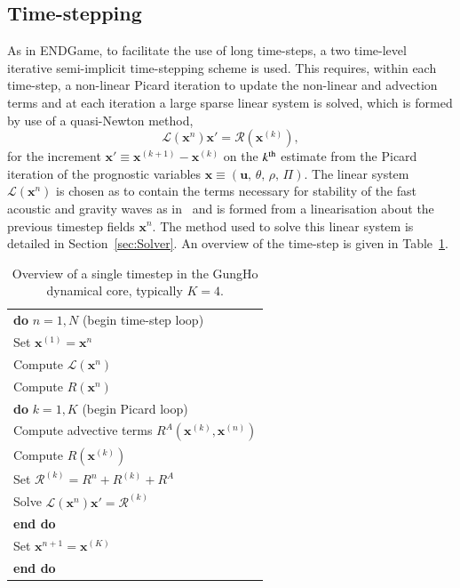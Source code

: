 \documentclass[review,times]{elsarticle}
\providecommand{\tabularnewline}{\\}
\begin{document}
\subsection{Time-stepping\label{sec:sub:timestepping}}
As in ENDGame, to facilitate the use of long time-steps, a two time-level 
iterative semi-implicit time-stepping scheme is used. This requires, within each 
time-step, a non-linear Picard iteration to update the non-linear and advection terms 
and at each iteration a large sparse linear system is solved, which is formed by 
use of a quasi-Newton method,
%
\begin{equation}
\mathcal{L}\left(\mathbf{x}^n\right)\mathbf{x}' = \mathcal{R}\left(\mathbf{x}^{(k)}\right),\label{eq:quasi-newton}
\end{equation}
%
for the increment $\mathbf{x}'\equiv\mathbf{x}^{(k+1)}-\mathbf{x}^{(k)}$ on the $k^{\rm{th}}$ 
estimate from the Picard iteration of the prognostic variables $\mathbf{x}\equiv\left(\mathbf{u},\,\theta,\,\rho,\,\Pi\right)$. 
The linear system $\mathcal{L}\left(\mathbf{x}^n\right)$ is chosen as to contain the terms necessary for stability of 
the fast acoustic and gravity waves as in~\cite{QJ:QJ2235} and is formed from a linearisation about the previous 
timestep fields $\mathbf{x}^n$. The method used to solve this linear system is detailed in Section~\ref{sec:Solver}. 
An overview of the time-step is given in Table~\ref{tab:timestep}.
%
\begin{table}
\begin{centering}
\begin{tabular}{l}
\hline 
\textbf{do} $n=1,N$ (begin time-step loop)\tabularnewline
\hspace{0.5cm}Set $\mathbf{x}^{(1)} = \mathbf{x}^n$\tabularnewline
\hspace{0.5cm}Compute $\mathcal{L}\left(\mathbf{x}^n\right)$\tabularnewline
\hspace{0.5cm}Compute $R\left(\mathbf{x}^n\right)$\tabularnewline
\hspace{0.5cm}\textbf{do} $k=1,K$ (begin Picard loop)\tabularnewline
\hspace{1.0cm}Compute advective terms $R^A\left(\mathbf{x}^{(k)},\mathbf{x}^{(n)}\right)$\tabularnewline
\hspace{1.0cm}Compute $R\left(\mathbf{x}^{(k)}\right)$\tabularnewline
\hspace{1.0cm}Set $\mathcal{R}^{(k)} = R^n + R^{(k)} + R^A$\tabularnewline

\hspace{1.0cm}Solve $\mathcal{L}\left(\mathbf{x}^n\right)\mathbf{x}' = \mathcal{R}^{(k)}$\tabularnewline
\hspace{0.5cm}\textbf{end do}\tabularnewline
\hspace{0.5cm}Set $\mathbf{x}^{n+1} = \mathbf{x}^{(K)}$\tabularnewline
\textbf{end do}\tabularnewline
\hline
\end{tabular}
\end{centering}
\caption{\label{tab:timestep}Overview of a single timestep in the GungHo dynamical core, typically $K=4$.}
\end{table}
%
\end{document}
